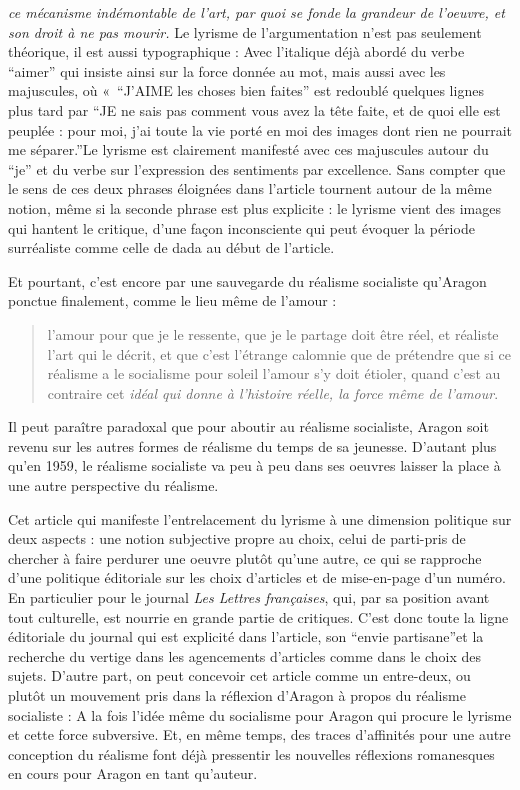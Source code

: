 \emph{ce mécanisme indémontable de l’art, par quoi se fonde la grandeur de l’oeuvre, et son droit à ne pas mourir.} Le lyrisme de l’argumentation n’est pas seulement théorique, il est aussi typographique : Avec l’italique déjà abordé du verbe \enquote{aimer} qui insiste ainsi sur la force donnée au mot, mais aussi avec les majuscules, où « \enquote{J’AIME les choses bien faites} est redoublé quelques lignes plus tard par \enquote{JE ne sais pas comment vous avez la tête faite, et de quoi elle est peuplée : pour moi, j’ai toute la vie porté en moi des images dont rien ne pourrait me séparer.}Le lyrisme est clairement manifesté avec ces majuscules autour du \enquote{je} et du verbe sur l’expression des sentiments par excellence. Sans compter que le sens de ces deux phrases éloignées dans l’article tournent autour de la même notion, même si la seconde phrase est plus explicite : le lyrisme vient des images qui hantent le critique, d’une façon inconsciente qui peut évoquer la période surréaliste comme celle de dada au début de l’article. 

	Et pourtant, c’est encore par une sauvegarde du réalisme socialiste qu’Aragon ponctue finalement, comme le lieu même de l’amour : 
\begin{quote}
  l’amour pour que je le ressente, que je le partage doit  être réel, et réaliste l’art qui le décrit, et que c’est l’étrange calomnie que de prétendre que si ce réalisme a le socialisme pour soleil l’amour s’y doit étioler, quand c’est au contraire cet \emph{idéal qui donne à l’histoire réelle, la force même de l’amour}.   
\end{quote}


Il peut paraître paradoxal que pour aboutir au réalisme socialiste, Aragon soit revenu sur les autres formes de réalisme du temps de sa jeunesse. D’autant plus qu’en 1959, le réalisme socialiste va peu à peu dans ses oeuvres laisser la place à une autre perspective du réalisme. 

	Cet article qui manifeste l’entrelacement du lyrisme à une dimension politique sur deux aspects : une notion subjective propre au choix, celui de parti-pris de chercher à faire perdurer une oeuvre plutôt qu’une autre, ce qui se rapproche d’une politique éditoriale sur les choix d’articles et de mise-en-page d’un numéro. En particulier pour le journal \emph{Les Lettres françaises}, qui, par sa position avant tout culturelle, est nourrie en grande partie de critiques. C’est donc toute la ligne éditoriale du journal qui est explicité dans l’article, son \enquote{envie partisane}et la recherche du vertige dans les agencements d’articles comme dans le choix des sujets. D’autre part, on peut concevoir cet article comme un entre-deux, ou plutôt un mouvement pris dans la réflexion d’Aragon à propos du réalisme socialiste :  A la fois l’idée même du socialisme  pour Aragon qui procure le lyrisme et cette force subversive. Et, en même temps, des traces d’affinités pour une autre conception du réalisme font déjà pressentir les nouvelles réflexions romanesques en cours pour Aragon en tant qu’auteur. 

